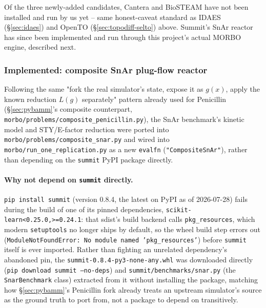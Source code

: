\documentclass[11pt]{article}
\begin{document}
Of the three newly-added candidates, Cantera and BioSTEAM have not been
installed and run by us yet -- same honest-caveat standard as IDAES
(\S\ref{sec:idaes}) and OpenTO (\S\ref{sec:topodiff-selto}) above.
Summit's SnAr reactor has since been implemented and run through this
project's actual MORBO engine, described next.

\subsubsection{Implemented: composite SnAr plug-flow reactor}
\label{sec:snar}

Following the same "fork the real simulator's state, expose it as
$g(x)$, apply the known reduction $L(g)$ separately" pattern already
used for Penicillin (\S\ref{sec:pybamm}'s composite counterpart,
\texttt{morbo/\allowbreak problems/\allowbreak composite\_penicillin.py}), the SnAr benchmark's
kinetic model and STY/E-factor reduction were ported into
\texttt{morbo/\allowbreak problems/\allowbreak composite\_snar.py} and wired into
\texttt{morbo/\allowbreak run\_one\_replication.py} as a new \texttt{evalfn}
(\texttt{"CompositeSnAr"}), rather than depending on the \texttt{summit}
PyPI package directly.

\paragraph{Why not depend on \texttt{summit} directly.} \texttt{pip
install summit} (version 0.8.4, the latest on PyPI as of 2026-07-28)
fails during the build of one of its pinned dependencies,
\texttt{scikit-learn<0.25.0,>=0.24.1}: that sdist's build backend calls
\texttt{pkg\_resources}, which modern \texttt{setuptools} no longer
ships by default, so the wheel build step errors out
(\texttt{ModuleNotFoundError: No module named 'pkg\_resources'}) before
\texttt{summit} itself is ever imported. Rather than fighting an
unrelated dependency's abandoned pin, the \texttt{summit-0.8.4-py3-none-any.whl}
was downloaded directly (\texttt{pip download summit --no-deps}) and
\texttt{summit/benchmarks/snar.py} (the \texttt{SnarBenchmark} class)
extracted from it without installing the package, matching how
\S\ref{sec:pybamm}'s Penicillin fork already treats an upstream
simulator's source as the ground truth to port from, not a package to
depend on transitively.
\end{document}
